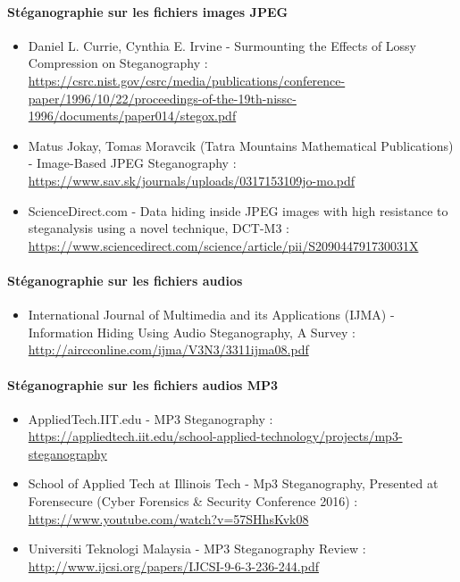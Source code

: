 \documentclass[11pt]{article}
\begin{document}
\paragraph{Stéganographie sur les fichiers images JPEG}
\begin{itemize}
\item Daniel L. Currie, Cynthia E. Irvine - Surmounting the Effects of Lossy
    Compression on Steganography : \\
    \url{https://csrc.nist.gov/csrc/media/publications/conference-paper/1996/10/22/proceedings-of-the-19th-nissc-1996/documents/paper014/stegox.pdf}
\item Matus Jokay, Tomas Moravcik (Tatra Mountains Mathematical Publications) -
    Image-Based JPEG Steganography : \\
    \url{https://www.sav.sk/journals/uploads/0317153109jo-mo.pdf}
\item ScienceDirect.com - Data hiding inside JPEG images with high resistance to
    steganalysis using a novel technique, DCT-M3 : \\
    \url{https://www.sciencedirect.com/science/article/pii/S209044791730031X}
\end{itemize}

\paragraph{Stéganographie sur les fichiers audios}
\begin{itemize}
\item International Journal of Multimedia and its Applications (IJMA) -
    Information Hiding Using Audio Steganography, A Survey : \\
    \url{http://aircconline.com/ijma/V3N3/3311ijma08.pdf}
\end{itemize}

\paragraph{Stéganographie sur les fichiers audios MP3}
\begin{itemize}
\item AppliedTech.IIT.edu - MP3 Steganography : \\
    \url{https://appliedtech.iit.edu/school-applied-technology/projects/mp3-steganography}
\item School of Applied Tech at Illinois Tech - Mp3 Steganography, Presented at
    Forensecure (Cyber Forensics \& Security Conference 2016) : \\
    \url{https://www.youtube.com/watch?v=57SHhsKvk08}
\item Universiti Teknologi Malaysia - MP3 Steganography Review : \\
    \url{http://www.ijcsi.org/papers/IJCSI-9-6-3-236-244.pdf}
\end{itemize}
\end{document}
